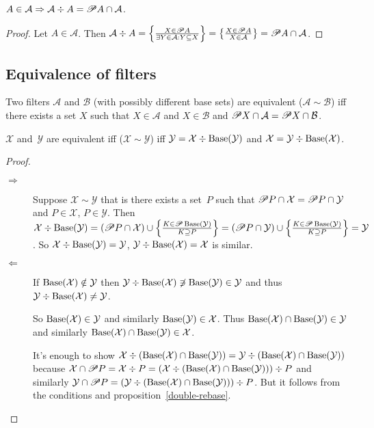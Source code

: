 \begin{prop}
$A\in\mathcal{A}\Rightarrow\mathcal{A}\div A=\mathscr{P} A\cap\mathcal{A}$.\end{prop}
\begin{proof}
Let $A\in\mathcal{A}$. Then $\mathcal{A}\div A=\left\{ \frac{X\in\mathscr{P} A}{\exists Y\in\mathcal{A}:Y\subseteq X}\right\}=\left\{ \frac{X\in\mathscr{P} A}{X\in\mathcal{A}}\right\}=\mathscr{P}A\cap\mathcal{A}$.\end{proof}

\subsection{Equivalence of filters}

\begin{defn}
Two filters $\mathcal{A}$ and $\mathcal{B}$
(with possibly different base sets) are equivalent ($\mathcal{A}\sim\mathcal{B}$)
iff there exists a set $X$ such that $X\in\mathcal{A}$ and $X\in\mathcal{B}$
and $\mathscr{P} X\cap\mathcal{A}=\mathscr{P} X\cap\mathcal{B}$.\end{defn}

\begin{prop}
$\mathcal{X}$ and~$\mathcal{Y}$ are equivalent iff
($\mathcal{X}\sim\mathcal{Y}$) iff
$\mathcal{Y} = \mathcal{X} \div \operatorname{Base}(\mathcal{Y})$ and
$\mathcal{X} = \mathcal{Y} \div \operatorname{Base}(\mathcal{X})$.\end{prop}

\begin{proof}
~
\begin{description}
\item[$\Rightarrow$] Suppose $\mathcal{X}\sim\mathcal{Y}$
that is there exists a set~$P$ such that
$\mathscr{P} P\cap\mathcal{X}=\mathscr{P} P\cap\mathcal{Y}$ and
$P\in\mathcal{X}$, $P\in\mathcal{Y}$. Then
$\mathcal{X}\div\operatorname{Base}(\mathcal{Y}) =
(\mathscr{P} P\cap\mathcal{X})\cup
\left\{ \frac{K\in\mathscr{P}\operatorname{Base}(\mathcal{Y})}{K\supseteq P}\right\} =
(\mathscr{P} P\cap\mathcal{Y})\cup
\left\{ \frac{K\in\mathscr{P}\operatorname{Base}(\mathcal{Y})}{K\supseteq P}\right\} =
\mathcal{Y}$. So
$\mathcal{X}\div\operatorname{Base}(\mathcal{Y}) = \mathcal{Y}$,
$\mathcal{Y}\div\operatorname{Base}(\mathcal{X}) = \mathcal{X}$ is similar.

\item[$\Leftarrow$] If $\operatorname{Base}(\mathcal{X})\notin\mathcal{Y}$ then
$\mathcal{Y}\div\operatorname{Base}(\mathcal{X})\not\ni\operatorname{Base}(\mathcal{Y})\in\mathcal{Y}$ and thus
$\mathcal{Y}\div\operatorname{Base}(\mathcal{X})\ne\mathcal{Y}$.

So $\operatorname{Base}(\mathcal{X})\in\mathcal{Y}$ and similarly
$\operatorname{Base}(\mathcal{Y})\in\mathcal{X}$. Thus
$\operatorname{Base}(\mathcal{X})\cap\operatorname{Base}(\mathcal{Y})\in\mathcal{Y}$
and similarly
$\operatorname{Base}(\mathcal{X})\cap\operatorname{Base}(\mathcal{Y})\in\mathcal{X}$.

It's enough to show
$\mathcal{X}\div(\operatorname{Base}(\mathcal{X})\cap\operatorname{Base}(\mathcal{Y})) =
\mathcal{Y}\div(\operatorname{Base}(\mathcal{X})\cap\operatorname{Base}(\mathcal{Y}))$
because $\mathcal{X}\cap\mathscr{P} P = \mathcal{X}\div P =
(\mathcal{X}\div(\operatorname{Base}(\mathcal{X})\cap\operatorname{Base}(\mathcal{Y})))\div P$ and similarly $\mathcal{Y}\cap\mathscr{P} P =
(\mathcal{Y}\div(\operatorname{Base}(\mathcal{X})\cap\operatorname{Base}(\mathcal{Y})))\div P$. But it follows from the conditions and
proposition~\ref{double-rebase}.
\end{description}
\end{proof}

